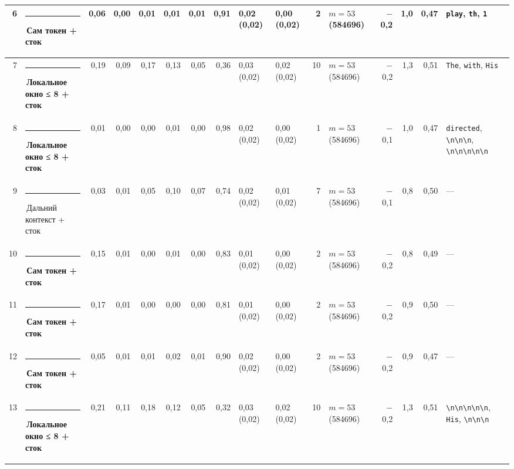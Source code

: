 \documentclass[10pt]{article}
\begin{document}
\begin{minipage}{\linewidth}
\begin{center}
{\begin{tabular}{|r|l|r|r|r|r|r|r|l|l|r|l|r|r|r|l|}
6 & \textcolor[HTML]{2A78D6}{\rule{0.62em}{0.62em}}\,\textbf{Сам токен + сток} & 0,06 & 0,00 & 0,01 & 0,01 & 0,01 & 0,91 & 0,02 (0,02) & 0,00 (0,02) & 2 & $m{=}53$ (584696) & $-$0,2 & 1,0 & 0,47 & \texttt{\textvisiblespace{}play}, \texttt{th}, \texttt{1} \\ \hline
7 & \textcolor[HTML]{1BAF7A}{\rule{0.62em}{0.62em}}\,\textbf{Локальное окно ≤ 8 + сток} & 0,19 & 0,09 & 0,17 & 0,13 & 0,05 & 0,36 & 0,03 (0,02) & 0,02 (0,02) & 10 & $m{=}53$ (584696) & $-$0,2 & 1,3 & 0,51 & \texttt{\textvisiblespace{}The}, \texttt{\textvisiblespace{}with}, \texttt{\textvisiblespace{}His} \\ \hline
8 & \textcolor[HTML]{1BAF7A}{\rule{0.62em}{0.62em}}\,\textbf{Локальное окно ≤ 8 + сток} & 0,01 & 0,00 & 0,00 & 0,01 & 0,00 & 0,98 & 0,02 (0,02) & 0,00 (0,02) & 1 & $m{=}53$ (584696) & $-$0,1 & 1,0 & 0,47 & \texttt{\textvisiblespace{}directed}, \texttt{\textvisiblespace{}\textbackslash{}n\textbackslash{}n\textbackslash{}n}, \texttt{\textvisiblespace{}\textbackslash{}n\textbackslash{}n\textbackslash{}n\textbackslash{}n\textbackslash{}n} \\ \hline
9 & \textcolor[HTML]{C3C2B7}{\rule{0.62em}{0.62em}}\,Дальний контекст + сток & 0,03 & 0,01 & 0,05 & 0,10 & 0,07 & 0,74 & 0,02 (0,02) & 0,01 (0,02) & 7 & $m{=}53$ (584696) & $-$0,1 & 0,8 & 0,50 & — \\ \hline
10 & \textcolor[HTML]{2A78D6}{\rule{0.62em}{0.62em}}\,\textbf{Сам токен + сток} & 0,15 & 0,01 & 0,00 & 0,01 & 0,00 & 0,83 & 0,01 (0,02) & 0,00 (0,02) & 2 & $m{=}53$ (584696) & $-$0,2 & 0,8 & 0,49 & — \\ \hline
11 & \textcolor[HTML]{2A78D6}{\rule{0.62em}{0.62em}}\,\textbf{Сам токен + сток} & 0,17 & 0,01 & 0,00 & 0,00 & 0,00 & 0,81 & 0,01 (0,02) & 0,00 (0,02) & 2 & $m{=}53$ (584696) & $-$0,2 & 0,9 & 0,50 & — \\ \hline
12 & \textcolor[HTML]{2A78D6}{\rule{0.62em}{0.62em}}\,\textbf{Сам токен + сток} & 0,05 & 0,01 & 0,01 & 0,02 & 0,01 & 0,90 & 0,02 (0,02) & 0,00 (0,02) & 2 & $m{=}53$ (584696) & $-$0,2 & 0,9 & 0,47 & — \\ \hline
13 & \textcolor[HTML]{1BAF7A}{\rule{0.62em}{0.62em}}\,\textbf{Локальное окно ≤ 8 + сток} & 0,21 & 0,11 & 0,18 & 0,12 & 0,05 & 0,32 & 0,03 (0,02) & 0,02 (0,02) & 10 & $m{=}53$ (584696) & $-$0,2 & 1,3 & 0,51 & \texttt{\textvisiblespace{}\textbackslash{}n\textbackslash{}n\textbackslash{}n\textbackslash{}n\textbackslash{}n}, \texttt{\textvisiblespace{}His}, \texttt{\textvisiblespace{}\textbackslash{}n\textbackslash{}n\textbackslash{}n} \\ \hline

\end{tabular}}
\end{center}
\end{minipage}
\end{document}
